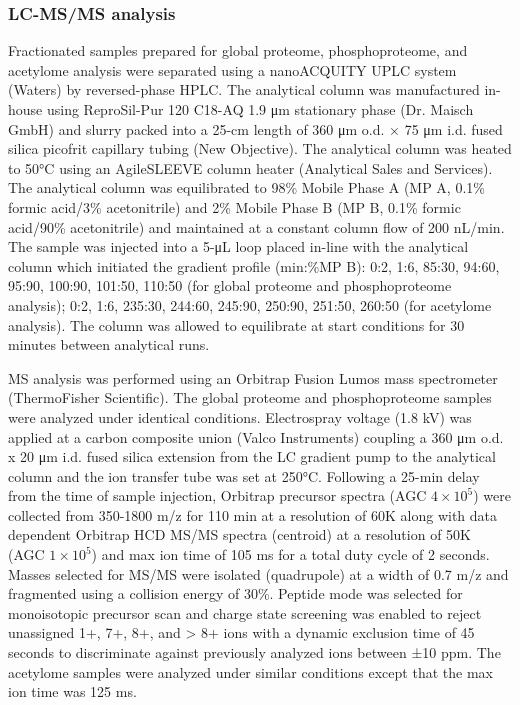 \subsubsection{LC-MS/MS analysis}
Fractionated samples prepared for global proteome, phosphoproteome, and acetylome analysis were separated using a nanoACQUITY UPLC system (Waters) by reversed-phase HPLC. The analytical column was manufactured in-house using ReproSil-Pur 120 C18-AQ 1.9 μm stationary phase (Dr. Maisch GmbH) and slurry packed into a 25-cm length of 360 μm o.d. × 75 μm i.d. fused silica picofrit capillary tubing (New Objective). The analytical column was heated to 50°C using an AgileSLEEVE column heater (Analytical Sales and Services). The analytical column was equilibrated to 98\% Mobile Phase A (MP A, 0.1\% formic acid/3\% acetonitrile) and 2\% Mobile Phase B (MP B, 0.1\% formic acid/90\% acetonitrile) and maintained at a constant column flow of 200 nL/min. The sample was injected into a 5-μL loop placed in-line with the analytical column which initiated the gradient profile (min:\%MP B): 0:2, 1:6, 85:30, 94:60, 95:90, 100:90, 101:50, 110:50 (for global proteome and phosphoproteome analysis); 0:2, 1:6, 235:30, 244:60, 245:90, 250:90, 251:50, 260:50 (for acetylome analysis). The column was allowed to equilibrate at start conditions for 30 minutes between analytical runs.

MS analysis was performed using an Orbitrap Fusion Lumos mass spectrometer (ThermoFisher Scientific). The global proteome and phosphoproteome samples were analyzed under identical conditions. Electrospray voltage (1.8 kV) was applied at a carbon composite union (Valco Instruments) coupling a 360 μm o.d. x 20 μm i.d. fused silica extension from the LC gradient pump to the analytical column and the ion transfer tube was set at 250°C. Following a 25-min delay from the time of sample injection, Orbitrap precursor spectra (AGC $4 \times 10^5$) were collected from 350-1800 m/z for 110 min at a resolution of 60K along with data dependent Orbitrap HCD MS/MS spectra (centroid) at a resolution of 50K (AGC $1 \times 10^5$) and max ion time of 105 ms for a total duty cycle of 2 seconds. Masses selected for MS/MS were isolated (quadrupole) at a width of 0.7 m/z and fragmented using a collision energy of 30\%. Peptide mode was selected for monoisotopic precursor scan and charge state screening was enabled to reject unassigned 1+, 7+, 8+, and > 8+ ions with a dynamic exclusion time of 45 seconds to discriminate against previously analyzed ions between ±10 ppm. The acetylome samples were analyzed under similar conditions except that the max ion time was 125 ms.


